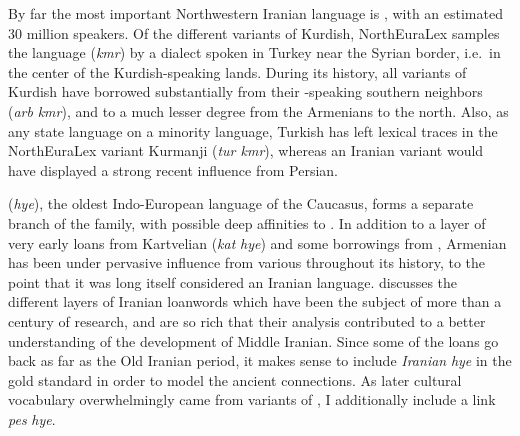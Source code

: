 By far the most important Northwestern Iranian language is , with an estimated 30 million speakers. Of the different variants of Kurdish, NorthEuraLex samples the  language (\textit{kmr}) by a dialect spoken in Turkey near the Syrian border, i.e.\ in the center of the Kurdish-speaking lands. During its history, all variants of Kurdish have borrowed substantially from their -speaking southern neighbors (\textit{arb} \arrowLA \textit{kmr}), and to a much lesser degree from the Armenians to the north. Also, as any state language on a minority language, Turkish has left lexical traces in the NorthEuraLex variant Kurmanji (\textit{tur \arrowLA kmr}), whereas an Iranian variant would have displayed a strong recent influence from Persian.

 (\textit{hye}), the oldest Indo-European language of the Caucasus, forms a separate branch of the family, with possible deep affinities to . In addition to a layer of very early loans from Kartvelian (\textit{kat} \arrowLA \textit{hye}) and some borrowings from , Armenian has been under pervasive influence from various  throughout its history, to the point that it was long itself considered an Iranian language. \cite{bailey1987} discusses the different layers of Iranian loanwords which have been the subject of more than a century of research, and are so rich that their analysis contributed to a better understanding of the development of Middle Iranian. Since some of the loans go back as far as the Old Iranian period, it makes sense to include \textit{Iranian} \arrowOA \textit{hye} in the gold standard in order to model the ancient connections. As later cultural vocabulary overwhelmingly came from 
variants of , I additionally include a link \textit{pes} \arrowOA \textit{hye}.

